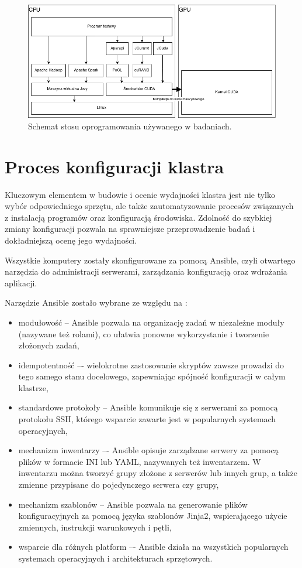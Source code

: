 \begin{figure}[h]
	\centering
	\includegraphics[width=1\textwidth]{graf/Stack.png}
	\caption{Schemat stosu oprogramowania używanego w badaniach.}
	\label{fig:software-stack}
\end{figure}

\section{Proces konfiguracji klastra}

Kluczowym elementem w budowie i ocenie wydajności klastra  jest nie tylko
wybór odpowiedniego sprzętu, ale także zautomatyzowanie procesów związanych z instalacją
programów oraz konfiguracją środowiska. Zdolność do szybkiej zmiany konfiguracji pozwala na
sprawniejsze przeprowadzenie badań i dokładniejszą ocenę jego wydajności.

Wszystkie komputery zostały skonfigurowane za pomocą Ansible, czyli otwartego narzędzia
do administracji serwerami, zarządzania konfiguracją oraz wdrażania aplikacji.
\newpage

Narzędzie Ansible zostało wybrane ze względu na \cite{ansible-whitepaper}:
\begin{itemize}
	\item modułowość -- Ansible pozwala na organizację zadań w niezależne moduły
	      (nazywane też rolami), co ułatwia ponowne wykorzystanie i tworzenie złożonych zadań,
	\item idempotentność –- wielokrotne zastosowanie skryptów zawsze prowadzi do tego
	      samego stanu docelowego, zapewniając spójność konfiguracji w całym klastrze,
	\item standardowe protokoły -- Ansible komunikuje się z serwerami za pomocą
	      protokołu SSH, którego wsparcie zawarte jest w popularnych systemach operacyjnych,
	\item mechanizm inwentarzy –-  Ansible opisuje zarządzane serwery za pomocą plików w formacie
	      INI lub YAML, nazywanych też inwentarzem. W inwentarzu można tworzyć grupy złożone z
	      serwerów lub innych grup, a także zmienne przypisane do pojedynczego serwera czy grupy,
	\item mechanizm szablonów -- Ansible pozwala na generowanie plików konfiguracyjnych za pomocą
	      języka szablonów Jinja2, wspierającego użycie zmiennych, instrukcji warunkowych i pętli,
	\item wsparcie dla różnych platform –- Ansible działa na wszystkich popularnych
	      systemach operacyjnych i architekturach sprzętowych.
\end{itemize}

